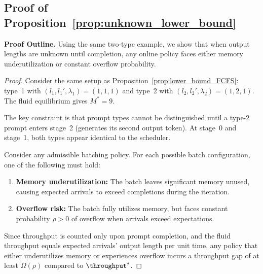 \subsection{Proof of Proposition~\ref{prop:unknown_lower_bound}}
\label{appendix:proof_unknown_lower_bound}

\noindent\textbf{Proof Outline.} Using the same two-type example, we show that when output lengths are unknown until completion, any online policy faces either memory underutilization or constant overflow probability.

\begin{proof}
Consider the same setup as Proposition~\ref{prop:lower_bound_FCFS}: type~1 with $(l_1, l_1', \lambda_1) = (1, 1, 1)$ and type~2 with $(l_2, l_2', \lambda_2) = (1, 2, 1)$. The fluid equilibrium gives $M^* = 9$.

The key constraint is that prompt types cannot be distinguished until a type-2 prompt enters stage~2 (generates its second output token). At stage~0 and stage~1, both types appear identical to the scheduler.

Consider any admissible batching policy. For each possible batch configuration, one of the following must hold:
\begin{enumerate}
\item \textbf{Memory underutilization:} The batch leaves significant memory unused, causing expected arrivals to exceed completions during the iteration.
\item \textbf{Overflow risk:} The batch fully utilizes memory, but faces constant probability $\rho > 0$ of overflow when arrivals exceed expectations.
\end{enumerate}

Since throughput is counted only upon prompt completion, and the fluid throughput equals expected arrivals' output length per unit time, any policy that either underutilizes memory or experiences overflow incurs a throughput gap of at least $\Omega(\rho)$ compared to $\throughput^*$.
\end{proof}









